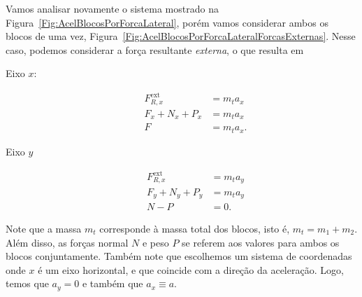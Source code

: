Vamos analisar novamente o sistema mostrado na Figura~\ref{Fig:AcelBlocosPorForcaLateral}, porém vamos considerar ambos os blocos de uma vez, Figura~\ref{Fig:AcelBlocosPorForcaLateralForcasExternas}. Nesse caso, podemos considerar a força resultante \emph{externa}, o que resulta em
\begin{description}
    \item[Eixo $x$:] 
        \begin{align}
            F_{R,x}^{\text{ext}} &= m_t a_x \\
            F_x + N_x + P_x &= m_t a_x \\
            F &= m_t a_x. \label{Eq:ExpressaoAcelBlocosPorForcaLateralForcasExternas}
        \end{align}
    \item[Eixo $y$]
        \begin{align}
            F_{R,x}^{\text{ext}} &= m_t a_y \\
            F_y + N_y + P_y &= m_t a_y \\
            N - P &= 0.
        \end{align}
\end{description}
%
Note que a massa $m_t$ corresponde à massa total dos blocos, isto é, $m_t = m_1 + m_2$. Além disso, as forças normal $N$ e peso $P$ se referem aos valores para ambos os blocos conjuntamente. Também note que escolhemos um sistema de coordenadas onde $x$ é um eixo horizontal, e que coincide com a direção da aceleração. Logo, temos que $a_y = 0$ e também que $a_x \equiv a$.

